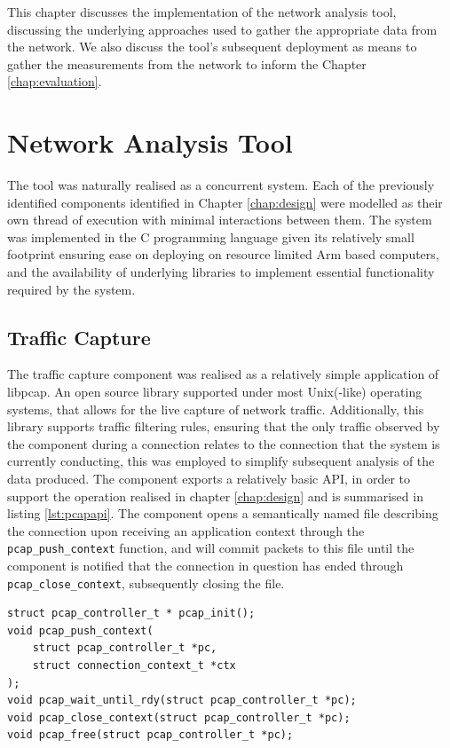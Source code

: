 \documentclass{l4proj}
\begin{document}
This chapter discusses the implementation of the network analysis tool, discussing the underlying approaches used to gather the appropriate data from the network. We also discuss the tool's subsequent deployment as means to gather the measurements from the network to inform the Chapter \ref{chap:evaluation}.

\section{Network Analysis Tool}

The tool was naturally realised as a concurrent system. Each of the previously identified components identified in Chapter \ref{chap:design} were modelled as their own thread of execution with minimal interactions between them. The system was implemented in the C programming language given its relatively small footprint ensuring ease on deploying on resource limited Arm based computers, and the availability of underlying libraries to implement essential functionality required by the system.

\subsection{Traffic Capture}

The traffic capture component was realised as a relatively simple application of libpcap. An open source library supported under most Unix(-like) operating systems, that allows for the live capture of network traffic. Additionally, this library supports traffic filtering rules, ensuring that the only traffic observed by the component during a connection relates to the connection that the system is currently conducting, this was employed to simplify subsequent analysis of the data produced. The component exports a relatively basic API, in order to support the operation realised in chapter \ref{chap:design} and is summarised in listing \ref{lst:pcapapi}. The component opens a semantically named file describing the connection upon receiving an application context through the \lstinline{pcap_push_context} function, and will commit packets to this file until the component is notified that the connection in question has ended through \lstinline{pcap_close_context}, subsequently closing the file.

\begin{lstlisting}[caption={The exported API of the traffic capture component to facilitate the live capture of traffic generated by the system.}]
struct pcap_controller_t * pcap_init();
void pcap_push_context(
    struct pcap_controller_t *pc,
    struct connection_context_t *ctx
);
void pcap_wait_until_rdy(struct pcap_controller_t *pc);
void pcap_close_context(struct pcap_controller_t *pc);
void pcap_free(struct pcap_controller_t *pc);

\end{lstlisting}
\end{document}
